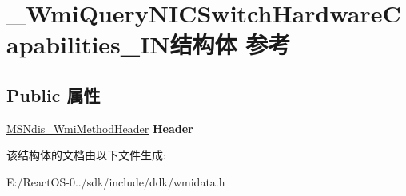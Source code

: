 \hypertarget{struct___wmi_query_n_i_c_switch_hardware_capabilities___i_n}{}\section{\+\_\+\+Wmi\+Query\+N\+I\+C\+Switch\+Hardware\+Capabilities\+\_\+\+I\+N结构体 参考}
\label{struct___wmi_query_n_i_c_switch_hardware_capabilities___i_n}
\subsection*{Public 属性}
\begin{DoxyCompactItemize}
\item 
\mbox{\label{struct___wmi_query_n_i_c_switch_hardware_capabilities___i_n_a9288ee570eda822371e3866e6807829b}} 
\hyperlink{struct___m_s_ndis___wmi_method_header}{M\+S\+Ndis\+\_\+\+Wmi\+Method\+Header} {\bfseries Header}
\end{DoxyCompactItemize}


该结构体的文档由以下文件生成\+:\begin{DoxyCompactItemize}
\item 
E\+:/\+React\+O\+S-\/0../sdk/include/ddk/wmidata.\+h\end{DoxyCompactItemize}
